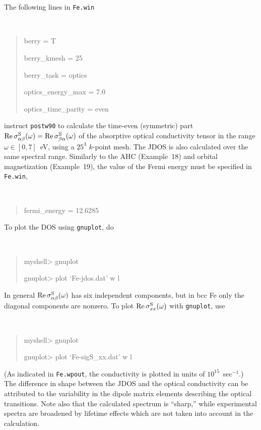 \documentclass[a4paper,11pt,twoside]{article}
\begin{document}
The following lines in {\tt Fe.win}
%
{\tt
\begin{quote}
berry = T

berry\_kmesh = 25

berry\_task = optics

optics\_energy\_max = 7.0

optics\_time\_parity = even 

\end{quote} }
%
instruct {\tt postw90} to calculate the time-even (symmetric) part
${\rm Re}\,\sigma^{\rm S}_{\alpha\beta}(\omega)={\rm Re}\,\sigma^{\rm
  S}_{\beta\alpha}(\omega)$ of the absorptive optical conductivity
tensor in the range $\omega\in [0,7]$~eV, using a $25^3$ $k$-point
mesh. The JDOS is also calculated over the same spectral
range. Similarly to the AHC (Example~18) and orbital magnetization
(Example~19), the value of the Fermi energy must be specified in {\tt
  Fe.win},
%
{\tt
\begin{quote}
fermi\_energy = 12.6285
\end{quote}
}

To plot the DOS using {\tt gnuplot}, do
%
{\tt
\begin{quote}
myshell> gnuplot

gnuplot> plot `Fe-jdos.dat' w l
\end{quote} }

In general ${\rm Re}\,\sigma^{\rm S}_{\alpha\beta}(\omega)$ has six independent
components, but in bcc Fe only the diagonal components are nonzero. 
To plot ${\rm Re}\,\sigma^{\rm S}_{xx}(\omega)$ with {\tt gnuplot},
use
%
{\tt
\begin{quote} myshell> gnuplot

gnuplot> plot `Fe-sigS\_xx.dat' w l
\end{quote} }
%
(As indicated in {\tt Fe.wpout}, the conductivity is plotted in units
of $10^{15}$~sec$^{-1}$.) The difference in shape between the JDOS and
the optical conductivity can be attributed to the variability in the
dipole matrix elements describing the optical transitions.  Note also
that the calculated spectrum is ``sharp,'' while experimental spectra
are broadened by lifetime effects which are not taken into account in
the calculation.
\end{document}
